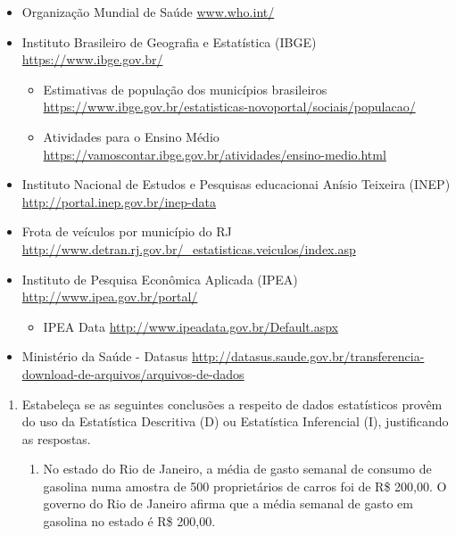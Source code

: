 {{\begin{itemize}
\item {} 
Organização Mundial de Saúde \textendash{} \url{www.who.int/}

\item {} 
Instituto Brasileiro de Geografia e Estatística (IBGE) \textendash{} \url{https://www.ibge.gov.br/}
\begin{itemize}
\item {} 
Estimativas de população dos municípios brasileiros \textendash{} \url{https://www.ibge.gov.br/estatisticas-novoportal/sociais/populacao/}

\item {} 
Atividades para o Ensino Médio \textendash{} \url{https://vamoscontar.ibge.gov.br/atividades/ensino-medio.html}

\end{itemize}

\item {} 
Instituto Nacional de Estudos e Pesquisas educacionai Anísio Teixeira (INEP) \textendash{} \url{http://portal.inep.gov.br/inep-data}



\item {} 
Frota de veículos por município do RJ \textendash{} \url{http://www.detran.rj.gov.br/\_estatisticas.veiculos/index.asp}

\item {} 
Instituto de Pesquisa Econômica Aplicada (IPEA) \textendash{} \url{http://www.ipea.gov.br/portal/}
\begin{itemize}
\item {} 
IPEA Data \textendash{} \url{http://www.ipeadata.gov.br/Default.aspx}

\end{itemize}

\item {} 
Ministério da Saúde - Datasus \textendash{} \url{http://datasus.saude.gov.br/transferencia-download-de-arquivos/arquivos-de-dados}

\end{itemize}


\exercise
\label{\detokenize{PE103-E:exercicios}}\label{\detokenize{PE103-E::doc}}
\begin{enumerate}
\item Estabeleça se as seguintes conclusões a respeito de dados estatísticos provêm do uso da Estatística Descritiva (D) ou Estatística Inferencial (I), justificando as respostas.
\begin{enumerate}
\item {} 
No estado do Rio de Janeiro, a média de gasto semanal de consumo de gasolina numa amostra de 500 proprietários de carros foi de R\$ 200,00. O governo do Rio de Janeiro afirma que a média semanal de gasto em gasolina no estado é R\$ 200,00.


\end{enumerate}
\end{enumerate}}}
